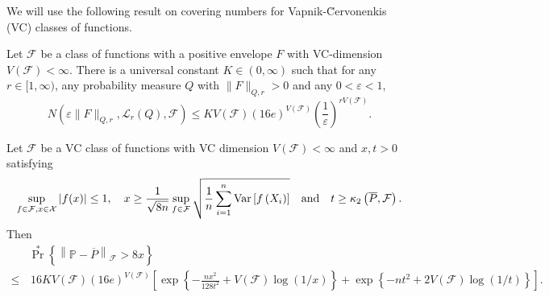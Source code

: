 We will use the following result on covering numbers for Vapnik-{\u C}ervonenkis
(VC)
classes of functions.

\begin{lemma}
\label{lem--VC-coverin-number}
Let \(\mathcal{F}\) be a class of functions with a positive envelope \(F\) with
VC-dimension \(V (\mathcal{F}) < \infty\).
There is a universal constant \(K \in (0, \infty)\) such that for any \(r \in
[1, \infty)\), any probability measure \(Q\) with \(\|F\|_{Q, r} > 0\) and any
\(0 < \varepsilon < 1\),
\begin{equation}
  N \left( \varepsilon \|F\|_{Q, r}, \mathscr{L}_{r} (Q), \mathcal{F} \right)
  \leq K V (\mathcal{F}) (16 e)^{V (\mathcal{F})} \left( \frac{1}{\varepsilon}
  \right)^{r V (\mathcal{F})}.
  \label{eqn--VC-coverin-number}
\end{equation}
\end{lemma}

\begin{theorem}
\label{thm--ep-prob-ineq-no-chain-VC}
Let \(\mathcal{F}\) be a VC class of functions with VC dimension \(V
(\mathcal{F}) < \infty\) and \(x, t > 0\) satisfying
\begin{equation*}
  \sup_{f \in \mathcal{F}, x \in
  \mathcal{X}} |f (x)| \leq 1, \quad x \geq \frac{1}{\sqrt{8 n}} \sup_{f \in
  \mathcal{F}} \sqrt{\frac{1}{n} \sum_{i = 1}^{n} \mathrm{Var} \left[ f \left( X_{i}
\right) \right]} \quad \text{and} \quad
  t \geq \kappa_{2} \left( \overline{P}, \mathcal{F} \right).
\end{equation*}
Then
\begin{equation}
  \begin{split}
    & \Pr^{\ast} \left\{ \left\| \mathbb{P} - \overline{P}
    \right\|_{\mathcal{F}} > 8 x \right\} \\
    \leq
    & \, 16 K V (\mathcal{F}) (16 e)^{V (\mathcal{F})} \left[ \exp \left\{ -
    \frac{n x^{2}}{128 t^{2}} + V (\mathcal{F}) \log (1 / x) \right\} + \exp
    \left\{ - n t^{2} + 2 V (\mathcal{F}) \log (1 / t) \right\} \right].
  \end{split}
  \label{eqn--ep-prob-ineq-no-chain-VC}
\end{equation}
\end{theorem}

